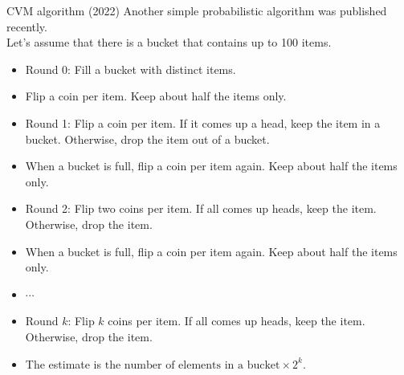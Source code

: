 \documentclass[10pt]{beamer}
\begin{document}
\begin{frame}[fragile]{CVM algorithm (2022)}
Another simple probabilistic algorithm was published recently. \\
Let's assume that there is a bucket that contains up to 100 items.

\begin{footnotesize}
\begin{itemize}
    \item Round 0: Fill a bucket with distinct items.
    \item Flip a coin per item. Keep about half the items only.
    \item Round 1: Flip a coin per item. If it comes up a head, keep
        the item in a bucket. Otherwise, drop the item out of a bucket.
    \item When a bucket is full, flip a coin per item again. Keep about
        half the items only.
    \item Round 2: Flip two coins per item. If all comes up heads, keep
        the item. Otherwise, drop the item.
    \item When a bucket is full, flip a coin per item again. Keep about
        half the items only.
    \item $\cdots$
    \item Round $k$: Flip $k$ coins per item. If all comes up heads, keep
        the item. Otherwise, drop the item.
    \item The estimate is $\text{the number of elements in a bucket} \times 2^k$.
\end{itemize}
\end{footnotesize}
\end{frame}
\end{document}
